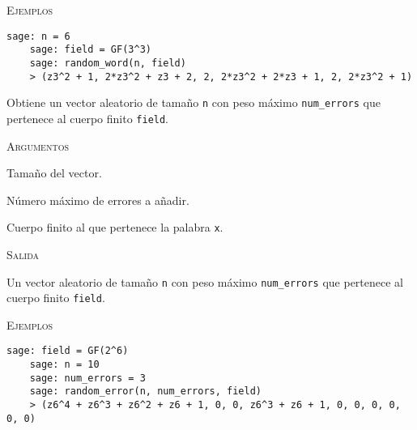 \begin{description}[leftmargin=1em, font=\normalfont\ttfamily, style=nextline]
  \textsc{Ejemplos}
  \begin{lstlisting}[gobble=4]
    sage: n = 6
    sage: field = GF(3^3)
    sage: random_word(n, field)
    > (z3^2 + 1, 2*z3^2 + z3 + 2, 2, 2*z3^2 + 2*z3 + 1, 2, 2*z3^2 + 1)
  \end{lstlisting}

  \item[random\_error(n, num\_errors, field)] Obtiene un vector aleatorio de tamaño \texttt{n} con peso máximo \texttt{num\_errors} que pertenece al cuerpo finito \texttt{field}.

  \textsc{Argumentos}
  \begin{description}[font=\normalfont\ttfamily]
    \item[n] Tamaño del vector.
    \item[num\_errors] Número máximo de errores a añadir.
    \item[field] Cuerpo finito al que pertenece la palabra \texttt{x}.
  \end{description}

  \textsc{Salida}
  \begin{description}[font=\normalfont\ttfamily]
    \item[] Un vector aleatorio de tamaño \texttt{n} con peso máximo \texttt{num\_errors} que pertenece al cuerpo finito \texttt{field}.
  \end{description}

  \textsc{Ejemplos}
  \begin{lstlisting}[gobble=4]
    sage: field = GF(2^6)
    sage: n = 10
    sage: num_errors = 3
    sage: random_error(n, num_errors, field)
    > (z6^4 + z6^3 + z6^2 + z6 + 1, 0, 0, z6^3 + z6 + 1, 0, 0, 0, 0, 0, 0)
  \end{lstlisting}
\end{description}